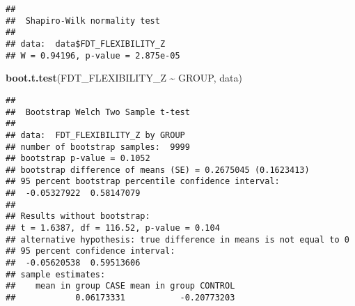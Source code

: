\documentclass[
]{article}
\newenvironment{Shaded}{\begin{snugshade}}{\end{snugshade}}
\newcommand{\FunctionTok}[1]{\textcolor[rgb]{0.13,0.29,0.53}{\textbf{#1}}}
\newcommand{\NormalTok}[1]{#1}
\newcommand{\SpecialCharTok}[1]{\textcolor[rgb]{0.81,0.36,0.00}{\textbf{#1}}}
\begin{document}
\begin{verbatim}
## 
##  Shapiro-Wilk normality test
## 
## data:  data$FDT_FLEXIBILITY_Z
## W = 0.94196, p-value = 2.875e-05
\end{verbatim}

\begin{Shaded}
\begin{Highlighting}[]
\FunctionTok{boot.t.test}\NormalTok{(FDT\_FLEXIBILITY\_Z }\SpecialCharTok{\textasciitilde{}}\NormalTok{ GROUP, data)}
\end{Highlighting}
\end{Shaded}

\begin{verbatim}
## 
##  Bootstrap Welch Two Sample t-test
## 
## data:  FDT_FLEXIBILITY_Z by GROUP
## number of bootstrap samples:  9999
## bootstrap p-value = 0.1052 
## bootstrap difference of means (SE) = 0.2675045 (0.1623413) 
## 95 percent bootstrap percentile confidence interval:
##  -0.05327922  0.58147079
## 
## Results without bootstrap:
## t = 1.6387, df = 116.52, p-value = 0.104
## alternative hypothesis: true difference in means is not equal to 0
## 95 percent confidence interval:
##  -0.05620538  0.59513606
## sample estimates:
##    mean in group CASE mean in group CONTROL 
##            0.06173331           -0.20773203
\end{verbatim}
\end{document}
